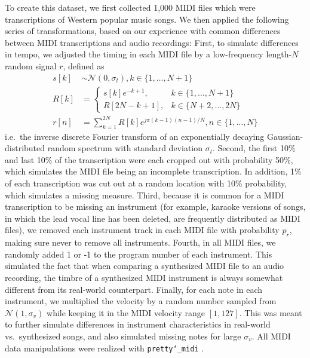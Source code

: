 To create this dataset, we first collected 1,000 MIDI files which were transcriptions of Western popular music songs.
We then applied the following series of transformations, based on our experience with common differences between MIDI transcriptions and audio recordings:
First, to simulate differences in tempo, we adjusted the timing in each MIDI file by a low-frequency length-$N$ random signal $r$, defined as
\begin{align}
s[k] &\sim \mathcal{N}(0, \sigma_t), k \in \{1, \ldots, N + 1\}\\
R[k] &= \begin{cases}
s[k]e^{-k + 1}, &k \in \{1, \ldots, N + 1\}\\
R[2N - k + 1], &k \in \{N + 2, \ldots, 2N \}
\end{cases}\\
r[n] &= \sum_{k = 1}^{2N} R[k]e^{j\pi (k - 1)(n - 1)/N}, n \in \{1, \ldots, N\}
\end{align}
i.e.\ the inverse discrete Fourier transform of an exponentially decaying Gaussian-distributed random spectrum with standard deviation $\sigma_t$.
Second, the first 10\% and last 10\% of the transcription were each cropped out with probability 50\%, which simulates the MIDI file being an incomplete transcription.
In addition, 1\% of each transcription was cut out at a random location with 10\% probability, which simulates a missing measure.
Third, because it is common for a MIDI transcription to be missing an instrument (for example, karaoke versions of songs, in which the lead vocal line has been deleted, are frequently distributed as MIDI files), we removed each instrument track in each MIDI file with probability $p_r$, making sure never to remove all instruments.
Fourth, in all MIDI files, we randomly added 1 or -1 to the program number of each instrument.
This simulated the fact that when comparing a synthesized MIDI file to an audio recording, the timbre of a synthesized MIDI instrument is always somewhat different from its real-world counterpart.
Finally, for each note in each instrument, we multiplied the velocity by a random number sampled from $\mathcal{N}(1, \sigma_v)$ while keeping it in the MIDI velocity range $[1, 127]$.
This was meant to further simulate differences in instrument characteristics in real-world vs.\ synthesized songs, and also simulated missing notes for large $\sigma_v$.
All MIDI data manipulations were realized with \texttt{pretty\char`_midi} \cite{raffel2014pretty_midi}.

